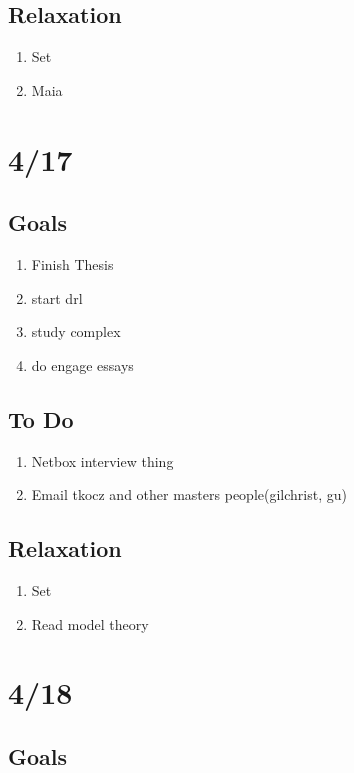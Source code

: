 \documentclass[11pt]{article}
\theoremstyle{remark}
\begin{document}
\subsection{Relaxation}

\begin{enumerate}
	\item Set
	\item Maia
\end{enumerate}

\section{4/17}

\subsection{Goals}

\begin{enumerate}
	\item Finish Thesis
	\item start drl
	\item study complex
	\item do engage essays
\end{enumerate}

\subsection{To Do}

\begin{enumerate}
	\item Netbox interview thing
	\item Email tkocz and other masters people(gilchrist, gu)
\end{enumerate}

\subsection{Relaxation}

\begin{enumerate}
	\item Set
	\item Read model theory
\end{enumerate}

\section{4/18}

\subsection{Goals}
\end{document}

